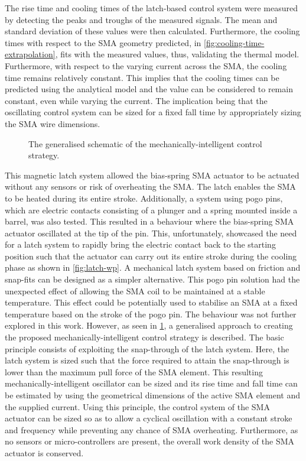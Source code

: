 The rise time and cooling times of the latch-based control system were measured by detecting the peaks and troughs of the measured signals. The mean and standard deviation of these values were then calculated. Furthermore, the cooling times with respect to the SMA geometry predicted, in \cref{fig:cooling-time-extrapolation}, fits with the measured values, thus, validating the thermal model. Furthermore, with respect to the varying current across the SMA, the cooling time remains relatively constant. This implies that the cooling times can be predicted using the analytical model and the value can be considered to remain constant, even while varying the current. The implication being that the oscillating control system can be sized for a fixed fall time by appropriately sizing the SMA wire dimensions.

\begin{figure}[hbt!] %
  \centering
  
  \caption{The generalised schematic of the mechanically-intelligent control strategy.}
  \label{fig:mi-osc-flowchart}
\end{figure}

This magnetic latch system allowed the bias-spring SMA actuator to be actuated without any sensors or risk of overheating the SMA. The latch enables the SMA to be heated during its entire stroke. Additionally, a system using pogo pins, which are electric contacts consisting of a plunger and a spring mounted inside a barrel, was also tested. This resulted in a behaviour where the bias-spring SMA actuator oscillated at the tip of the pin. This, unfortunately, showcased the need for a latch system to rapidly bring the electric contact back to the starting position such that the actuator can carry out its entire stroke during the cooling phase as shown in \cref{fig:latch-wp}. A mechanical latch system based on friction and snap-fits can be designed as a simpler alternative. This pogo pin solution had the unexpected effect of allowing the SMA coil to be maintained at a stable temperature. This effect could be potentially used to stabilise an SMA at a fixed temperature based on the stroke of the pogo pin. The behaviour was not further explored in this work. However, as seen in \cref{fig:mi-osc-flowchart}, a generalised approach to creating the proposed mechanically-intelligent control strategy is described. The basic principle consists of exploiting the snap-through of the latch system. Here, the latch system is sized such that the force required to attain the snap-through is lower than the maximum pull force of the SMA element. This resulting mechanically-intelligent oscillator can be sized and its rise time and fall time can be estimated by using the geometrical dimensions of the active SMA element and the supplied current. Using this principle, the control system of the SMA actuator can be sized so as to allow a cyclical oscillation with a constant stroke and frequency while preventing any chance of SMA overheating. Furthermore, as no sensors or micro-controllers are present, the overall work density of the SMA actuator is conserved.

